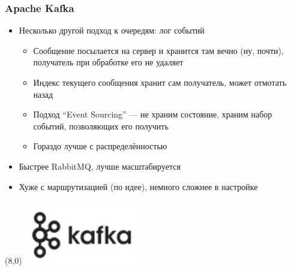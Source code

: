 \documentclass{../../slides-style}
\begin{document}
    \begin{frame}
        \frametitle{Apache Kafka}
        \begin{itemize}
            \item Несколько другой подход к очередям: лог событий
            \begin{itemize}
                \item Сообщение посылается на сервер и хранится там вечно (ну, почти), получатель при обработке его не удаляет
                \item Индекс текущего сообщения хранит сам получатель, может отмотать назад
                \item Подход ``Event Sourcing'' --- не храним состояние, храним набор событий, позволяющих его получить
                \item Гораздо лучше с распределённостью
            \end{itemize}
            \item Быстрее RabbitMQ, лучше масштабируется
            \item Хуже с маршрутизацией (по идее), немного сложнее в настройке
        \end{itemize}
        \begin{textblock}{3}(8,0)
            \includegraphics[width=\textwidth]{kafkaLogo.png}
        \end{textblock}
    \end{frame}
\end{document}
